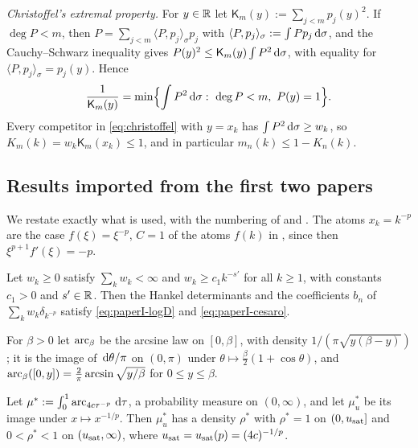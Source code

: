 \emph{Christoffel's extremal property.} For $y\in\mathbb{R}$ let $\mathsf K_m(y):=\sum_{j<m}p_j(y)^2$. If $\deg P<m$, then
$P=\sum_{j<m}\langle P,p_j\rangle_\sigma p_j$ with $\langle P,p_j\rangle_\sigma:=\int Pp_j\,\mathrm{d}\sigma$, and the
Cauchy--Schwarz inequality gives $P(y)^2\le\mathsf K_m(y)\int P^2\,\mathrm{d}\sigma$, with equality for
$\langle P,p_j\rangle_\sigma=p_j(y)$. Hence
\begin{equation}\label{eq:christoffel}
  \frac1{\mathsf K_m(y)}=\min\Bigl\{\int P^2\diff\sigma:\ \deg P<m,\ P(y)=1\Bigr\}.
\end{equation}
Every competitor in \eqref{eq:christoffel} with $y=x_k$ has $\int P^2\,\mathrm{d}\sigma\ge w_k$, so
$K_m(k)=w_k\mathsf K_m(x_k)\le1$, and in particular $m_n(k)\le1-K_n(k)$.

\subsection{Results imported from the first two papers}\label{sec:imports}
We restate exactly what is used, with the numbering of \cite{PaperI} and \cite{PaperII}. The atoms
$x_k=k^{-p}$ are the case $f(\xi)=\xi^{-p}$, $C=1$ of the atoms $f(k)$ in \cite{PaperI}, since then
$\xi^{p+1}f'(\xi)=-p$.

\begin{theorem}\label{thm:imp-avg}
Let $w_k\ge0$ satisfy $\sum_kw_k<\infty$ and $w_k\ge c_1k^{-s'}$ for all $k\ge1$, with constants $c_1>0$ and
$s'\in\mathbb{R}$. Then the Hankel determinants and the coefficients $b_n$ of $\sum_kw_k\delta_{k^{-p}}$ satisfy
\eqref{eq:paperI-logD} and \eqref{eq:paperI-cesaro}.
\end{theorem}

For $\beta>0$ let $\operatorname{arc}_\beta$ be the arcsine law on $[0,\beta]$, with density $1/(\pi\sqrt{y(\beta-y)})$; it is the
image of $\,\mathrm{d}\theta/\pi$ on $(0,\pi)$ under $\theta\mapsto\frac\beta2(1+\cos\theta)$, and
$\operatorname{arc}_\beta([0,y])=\frac2\pi\arcsin\sqrt{y/\beta}$ for $0\le y\le\beta$.

\begin{proposition}\label{prop:imp-eq}
Let $\mu^*:=\int_0^1\operatorname{arc}_{4c\tau^{-p}}\,\mathrm{d}\tau$, a probability measure on $(0,\infty)$, and let $\mu^*_u$ be its image
under $x\mapsto x^{-1/p}$. Then $\mu^*_u$ has a density $\rho^*$ with $\rho^*=1$ on $(0,u_{\mathrm{sat}}]$ and $0<\rho^*<1$ on
$(u_{\mathrm{sat}},\infty)$, where $u_{\mathrm{sat}}=u_{\mathrm{sat}}(p)=(4c)^{-1/p}$.
\end{proposition}

